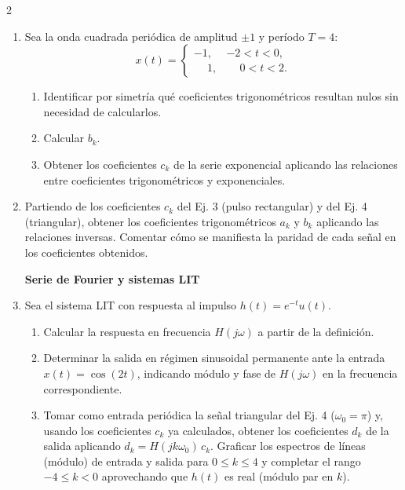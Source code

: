 \documentclass[10pt,a4paper]{article}
\begin{document}
\begin{multicols}{2}
\begin{enumerate}
			\textbf{Serie trigonométrica}
			\item Sea la onda cuadrada periódica de amplitud $\pm 1$ y período $T = 4$:
			\[
				x(t) =
				\begin{cases}
					-1, & -2 < t < 0, \\
					\phantom{-}1, & \phantom{-}0 < t < 2.
				\end{cases}
			\]
			\begin{enumerate}
				\item Identificar por simetría qué coeficientes trigonométricos resultan nulos sin necesidad de calcularlos.
				\item Calcular $b_k$.
				\item Obtener los coeficientes $c_k$ de la serie exponencial aplicando las relaciones entre coeficientes trigonométricos y exponenciales.
			\end{enumerate}

			\item Partiendo de los coeficientes $c_k$ del Ej. 3 (pulso rectangular) y del Ej. 4 (triangular), obtener los coeficientes trigonométricos $a_k$ y $b_k$ aplicando las relaciones inversas. Comentar cómo se manifiesta la paridad de cada señal en los coeficientes obtenidos.

			\textbf{Serie de Fourier y sistemas LIT}
			\item Sea el sistema LIT con respuesta al impulso $h(t) = e^{-t}u(t)$.
			\begin{enumerate}
				\item Calcular la respuesta en frecuencia $H(j\omega)$ a partir de la definición.
				\item Determinar la salida en régimen sinusoidal permanente ante la entrada $x(t) = \cos(2t)$, indicando módulo y fase de $H(j\omega)$ en la frecuencia correspondiente.
				\item Tomar como entrada periódica la señal triangular del Ej. 4 ($\omega_0 = \pi$) y, usando los coeficientes $c_k$ ya calculados, obtener los coeficientes $d_k$ de la salida aplicando $d_k = H(jk\omega_0)\,c_k$. Graficar los espectros de líneas (módulo) de entrada y salida para $0 \leq k \leq 4$ y completar el rango $-4 \leq k < 0$ aprovechando que $h(t)$ es real (módulo par en $k$).
			\end{enumerate}


\end{enumerate}
\end{multicols}
\end{document}
